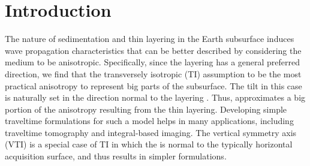 \newpage

\section{Introduction}

The nature of sedimentation and thin layering in the Earth subsurface induces wave propagation
characteristics that can be better described by considering the medium to be anisotropic. Specifically, since the layering has a general preferred direction, 
 we find that the transversely isotropic (TI) assumption to be the most practical 
anisotropy to represent big parts of the subsurface. The tilt in this case is naturally set in the direction normal to the layering
\cite[]{SEG-2000-09650968,audebert:P185,ttt,alkhalifah:A19}.
Thus,   approximates 
a big portion of the anisotropy resulting from the thin layering. Developing simple traveltime formulations
for such a model helps in many applications, including traveltime tomography and integral-based  imaging. 
The vertical symmetry axis (VTI)  is a special case of
TI in which the   is normal to the typically horizontal acquisition surface, and thus results in simpler formulations.

